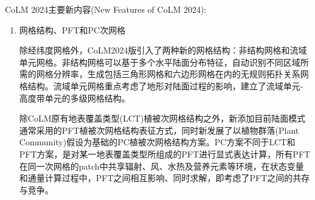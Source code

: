 CoLM 2024主要新内容(New Features of CoLM 2024):
\begin{enumerate}[label={\arabic*)}]
    \item 网格结构、PFT和PC次网格

    除经纬度网格外，CoLM2024版引入了两种新的网格结构：非结构网格和流域单元网格。非结构网格可以基于多个水平陆面分布特征，自动识别不同区域所需的网格分辨率，生成包括三角形网格和六边形网格在内的无规则拓扑关系网格结构。流域单元网格重点考虑了地形对陆面过程的影响，建立了流域单元-高度带单元的多级网格结构。

    除CoLM原有地表覆盖类型(LCT)植被次网格结构之外，新添加目前陆面模式通常采用的PFT植被次网格结构表征方式，同时新发展了以植物群落(Plant Community)假设为基础的PC植被次网格结构方案。PC方案不同于LCT和PFT方案，是对某一地表覆盖类型所组成的PFT进行显式表达计算，所有PFT在同一次网格的patch中共享辐射、风、水热及营养元素等环境，在状态变量和通量计算过程中，PFT之间相互影响、同时求解，即考虑了PFT之间的共存与竞争。
    

\end{enumerate}
